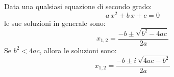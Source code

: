 Data una qualsiasi equazione di secondo grado:
\[
a \, x^2 + b \, x + c = 0
\]
le sue soluzioni in generale sono:
\[
x_{1,2} = \frac{-b \pm \sqrt{b^2 - 4 a c}}{2 a}
\]
Se $b^2 < 4 ac$, allora le soluzioni sono:
\[
x_{1,2} = \frac{-b \pm i \, \sqrt{4 a c - b^2}}{2 a}
\]







































